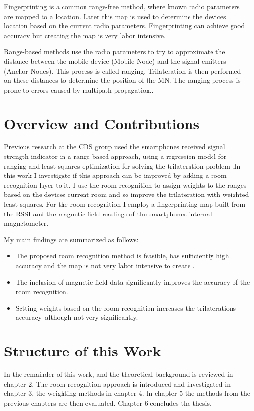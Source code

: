 Fingerprinting is a common range-free method, where known radio parameters are mapped to a location. Later this map is used to determine the devices location based on the current radio parameters. Fingerprinting can achieve good accuracy but creating the map is very labor intensive\cite{FineGrainedIndoorTracking}.

Range-based methods use the radio parameters to try to approximate the distance between the mobile device (Mobile Node) and the signal emitters (Anchor Nodes). This process is called ranging. Trilateration is then performed on these distances to determine the position of the MN. The ranging process is prone to errors caused by multipath propagation.\cite{FineGrainedIndoorTracking}.

\section{Overview and Contributions}

Previous research at the CDS group used the smartphones received signal strength indicator in a range-based approach, using a regression model for ranging and least squares optimization for solving the trilateration problem .In this work I investigate if this approach can be improved by adding a room recognition layer to it. I use the room recognition to assign weights to the ranges based on the devices current room and so improve the trilateration with weighted least squares. For the room recognition I employ a fingerprinting map built from the RSSI and the magnetic field readings of the smartphones internal magnetometer.

My main findings are summarized as follows:
\begin{itemize}
\item The proposed room recognition method is feasible, has sufficiently high accuracy and the map is not very labor intensive to create .
\item The inclusion of magnetic field data significantly improves the accuracy of the room recognition.
\item Setting weights based on the room recognition increases the trilaterations accuracy, although not very significantly.
\end{itemize}

\section{Structure of this Work}

\noindent In the remainder of this work,  and the theoretical background is reviewed in chapter 2. The room recognition approach is introduced and investigated in chapter 3, the weighting methods in chapter 4. In chapter 5 the methods from the previous chapters are then evaluated. Chapter 6 concludes the thesis. \\\\
